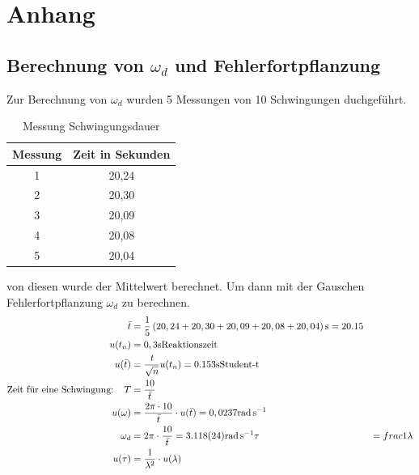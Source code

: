 \documentclass[11pt, a4paper]{article}
\begin{document}
    \section{Anhang}

    \subsection{Berechnung von $\omega_d$ und Fehlerfortpflanzung} \label{sec:omega}
    Zur Berechnung von $\omega_d$ wurden 5 Messungen von 10 Schwingungen duchgeführt.
    \begin{table}
        \centering
        \begin{tabular}{c c}
            Messung & Zeit in Sekunden \\ \hline
            1 & 20,24 \\
            2 & 20,30 \\
            3 & 20,09 \\
            4 & 20,08 \\
            5 & 20,04
        \end{tabular}
        \caption{Messung Schwingungsdauer}
        \label{Tab:messen}
    \end{table}
    von diesen wurde der Mittelwert berechnet. Um dann mit der Gauschen Fehlerfortpflanzung \cite[(19)]{ABW} $\omega_d$ zu berechnen.
    \begin{align}
        \bar{t} &= \frac{1}{5} \left(20,24 + 20,30 + 20,09 + 20,08 + 20,04 \right) \si{\second} = 20.15 \\
        u(t_n) &= 0,3 \si{\second} \text{Reaktionszeit} \\
        u(\bar{t}) &= \frac{{\it t}}{\sqrt{n}} u(t_n) = 0.153 \si{\second} \text{Student-t} \\
        \text{Zeit für eine Schwingung: } \ \ T &= \frac{10}{\bar{t}} \\
        u(\omega) &= \frac{2 \pi \cdot 10}{\bar{t}} \cdot u(\bar{t}) = 0,0237 \si{\radian\per\second} \\
        \omega_d &= 2 \pi \cdot \frac{10}{\bar{t}} = 3.118(24) \si{\radian\per\second}
        \tau &= frac{1}{\lambda} \\
        u(\tau) &= \frac{1}{\lambda^2} \cdot u(\lambda)
    \end{align}


    
    
\end{document}
